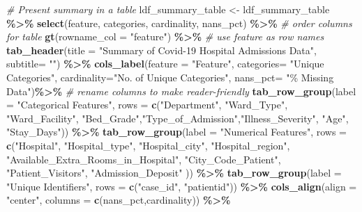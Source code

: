 \documentclass[
]{article}
\newenvironment{Shaded}{\begin{snugshade}}{\end{snugshade}}
\newcommand{\AttributeTok}[1]{\textcolor[rgb]{0.13,0.29,0.53}{#1}}
\newcommand{\CommentTok}[1]{\textcolor[rgb]{0.56,0.35,0.01}{\textit{#1}}}
\newcommand{\FunctionTok}[1]{\textcolor[rgb]{0.13,0.29,0.53}{\textbf{#1}}}
\newcommand{\NormalTok}[1]{#1}
\newcommand{\OtherTok}[1]{\textcolor[rgb]{0.56,0.35,0.01}{#1}}
\newcommand{\SpecialCharTok}[1]{\textcolor[rgb]{0.81,0.36,0.00}{\textbf{#1}}}
\newcommand{\StringTok}[1]{\textcolor[rgb]{0.31,0.60,0.02}{#1}}
\begin{document}
\begin{Shaded}
\begin{Highlighting}[]
\CommentTok{\# Present summary in a table }
\NormalTok{ldf\_summary\_table }\OtherTok{\textless{}{-}}\NormalTok{ ldf\_summary\_table }\SpecialCharTok{\%\textgreater{}\%} 
  \FunctionTok{select}\NormalTok{(feature, categories, cardinality, nans\_pct) }\SpecialCharTok{\%\textgreater{}\%} \CommentTok{\# order columns for table}
  \FunctionTok{gt}\NormalTok{(}\AttributeTok{rowname\_col =} \StringTok{"feature"}\NormalTok{) }\SpecialCharTok{\%\textgreater{}\%} \CommentTok{\# use feature as row names}
  \FunctionTok{tab\_header}\NormalTok{(}\AttributeTok{title =} \StringTok{"Summary of Covid{-}19 Hospital Admissions Data"}\NormalTok{,}
             \AttributeTok{subtitle=} \StringTok{""}\NormalTok{) }\SpecialCharTok{\%\textgreater{}\%} 
  \FunctionTok{cols\_label}\NormalTok{(}\AttributeTok{feature =} \StringTok{"Feature"}\NormalTok{,}
             \AttributeTok{categories=} \StringTok{"Unique Categories"}\NormalTok{,}
             \AttributeTok{cardinality=}\StringTok{"No. of Unique Categories"}\NormalTok{,}
             \AttributeTok{nans\_pct=} \StringTok{"\% Missing Data"}\NormalTok{)}\SpecialCharTok{\%\textgreater{}\%} \CommentTok{\# rename columns to make reader{-}friendly}
  \FunctionTok{tab\_row\_group}\NormalTok{(}\AttributeTok{label =} \StringTok{"Categorical Features"}\NormalTok{,}
                \AttributeTok{rows =} \FunctionTok{c}\NormalTok{(}\StringTok{"Department"}\NormalTok{, }\StringTok{"Ward\_Type"}\NormalTok{, }\StringTok{"Ward\_Facility"}\NormalTok{, }\StringTok{"Bed\_Grade"}\NormalTok{,}\StringTok{"Type\_of\_Admission"}\NormalTok{,}\StringTok{"Illness\_Severity"}\NormalTok{, }\StringTok{"Age"}\NormalTok{, }\StringTok{"Stay\_Days"}\NormalTok{)) }\SpecialCharTok{\%\textgreater{}\%}
  \FunctionTok{tab\_row\_group}\NormalTok{(}\AttributeTok{label =} \StringTok{"Numerical Features"}\NormalTok{,}
                \AttributeTok{rows =} \FunctionTok{c}\NormalTok{(}\StringTok{"Hospital"}\NormalTok{, }\StringTok{"Hospital\_type"}\NormalTok{, }\StringTok{"Hospital\_city"}\NormalTok{, }\StringTok{"Hospital\_region"}\NormalTok{, }\StringTok{"Available\_Extra\_Rooms\_in\_Hospital"}\NormalTok{, }\StringTok{"City\_Code\_Patient"}\NormalTok{, }\StringTok{"Patient\_Visitors"}\NormalTok{, }\StringTok{"Admission\_Deposit"}\NormalTok{ )) }\SpecialCharTok{\%\textgreater{}\%} 
  \FunctionTok{tab\_row\_group}\NormalTok{(}\AttributeTok{label =} \StringTok{"Unique Identifiers"}\NormalTok{,}
                \AttributeTok{rows =} \FunctionTok{c}\NormalTok{(}\StringTok{"case\_id"}\NormalTok{, }\StringTok{"patientid"}\NormalTok{)) }\SpecialCharTok{\%\textgreater{}\%} 
  \FunctionTok{cols\_align}\NormalTok{(}\AttributeTok{align =} \StringTok{"center"}\NormalTok{, }\AttributeTok{columns =} \FunctionTok{c}\NormalTok{(nans\_pct,cardinality)) }\SpecialCharTok{\%\textgreater{}\%}

\end{Highlighting}
\end{Shaded}
\end{document}

